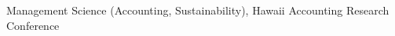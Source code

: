 
\vspace{-1mm}
\begin{cventries}

    \cventrylong
        {Management Science (Accounting, Sustainability), Hawaii Accounting Research Conference}  %
        {} %
        {}
    
\end{cventries}



    


